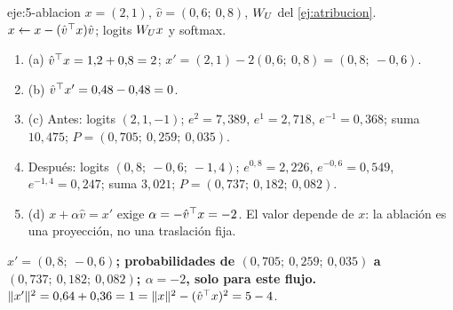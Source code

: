 \begin{solucion}{eje:5-ablacion}
\datos $x=(2,1)$, $\hat v=(0{,}6;\allowbreak\ 0{,}8)$, $W_{U}$ del \cref{ej:atribucion}.
\planteamiento $x\leftarrow x-(\hat v^{\top} x)\hat v$; logits $W_{U} x$ y softmax.
\pasos
\begin{enumerate}[label=\arabic*.]
  \item (a) $\hat v^{\top} x=1{,}2+0{,}8=2$; $x'=(2,1)-2(0{,}6;\allowbreak\ 0{,}8)=(0{,}8;\allowbreak\ -0{,}6)$.
  \item (b) $\hat v^{\top} x'=0{,}48-0{,}48=0$.
  \item (c) Antes: logits $(2,1,-1)$; $e^{2}=7{,}389$, $e^{1}=2{,}718$, $e^{-1}=0{,}368$; suma $10{,}475$; $P=(0{,}705;\allowbreak\ 0{,}259;\allowbreak\ 0{,}035)$.
  \item Después: logits $(0{,}8;\allowbreak\ -0{,}6;\allowbreak\ -1{,}4)$; $e^{0{,}8}=2{,}226$, $e^{-0{,}6}=0{,}549$, $e^{-1{,}4}=0{,}247$; suma $3{,}021$; $P=(0{,}737;\allowbreak\ 0{,}182;\allowbreak\ 0{,}082)$.
  \item (d) $x+\alpha\hat v=x'$ exige $\alpha=-\hat v^{\top} x=-2$. El valor depende de $x$: la ablación es una proyección, no una traslación fija.
\end{enumerate}
\resultado \textbf{$x'=(0{,}8;\allowbreak\ -0{,}6)$; probabilidades de $(0{,}705;\allowbreak\ 0{,}259;\allowbreak\ 0{,}035)$ a $(0{,}737;\allowbreak\ 0{,}182;\allowbreak\ 0{,}082)$; $\alpha=-2$, solo para este flujo.}
\comprobacion $\lVert x'\rVert^{2}=0{,}64+0{,}36=1=\lVert x\rVert^{2}-(\hat v^{\top} x)^{2}=5-4$.
\end{solucion}

